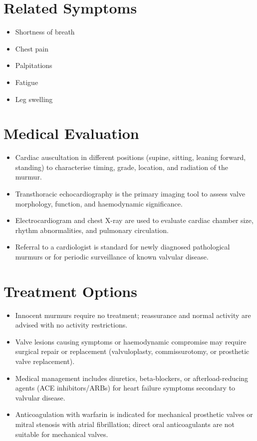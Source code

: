 \section*{Related Symptoms}
\begin{itemize}
  \item Shortness of breath
  \item Chest pain
  \item Palpitations
  \item Fatigue
  \item Leg swelling
\end{itemize}

\section*{Medical Evaluation}
\begin{itemize}
  \item Cardiac auscultation in different positions (supine, sitting, leaning forward, standing) to characterise timing, grade, location, and radiation of the murmur.
  \item Transthoracic echocardiography is the primary imaging tool to assess valve morphology, function, and haemodynamic significance.
  \item Electrocardiogram and chest X-ray are used to evaluate cardiac chamber size, rhythm abnormalities, and pulmonary circulation.
  \item Referral to a cardiologist is standard for newly diagnosed pathological murmurs or for periodic surveillance of known valvular disease.
\end{itemize}

\section*{Treatment Options}
\begin{itemize}
  \item Innocent murmurs require no treatment; reassurance and normal activity are advised with no activity restrictions.
  \item Valve lesions causing symptoms or haemodynamic compromise may require surgical repair or replacement (valvuloplasty, commissurotomy, or prosthetic valve replacement).
  \item Medical management includes diuretics, beta-blockers, or afterload-reducing agents (ACE inhibitors/ARBs) for heart failure symptoms secondary to valvular disease.
  \item Anticoagulation with warfarin is indicated for mechanical prosthetic valves or mitral stenosis with atrial fibrillation; direct oral anticoagulants are not suitable for mechanical valves.
\end{itemize}

